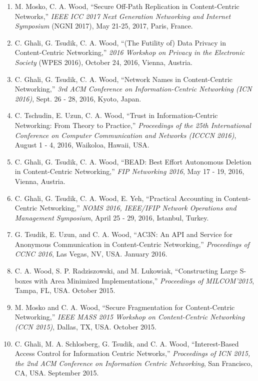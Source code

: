 \documentclass[10pt]{res}
\begin{document}
\begin{resume}
\begin{enumerate}[C-1.]
\item M. Mosko, C. A. Wood, ``Secure Off-Path Replication in Content-Centric Networks,'' \emph{IEEE ICC 2017 Next Generation Networking and Internet Symposium} (NGNI 2017), May 21-25, 2017, Paris, France.

\item C. Ghali, G. Tsudik, C. A. Wood, ``(The Futility of) Data Privacy in Content-Centric Networking,'' \emph{2016 Workshop on Privacy in the Electronic Society} (WPES 2016), October 24, 2016, Vienna, Austria.

\item C. Ghali, G. Tsudik, C. A. Wood, ``Network Names in Content-Centric Networking,'' \emph{3rd ACM Conference on Information-Centric Networking (ICN 2016)}, Sept. 26 - 28, 2016, Kyoto, Japan.

\item C. Tschudin, E. Uzun, C. A. Wood, ``Trust in Information-Centric Networking: From Theory to Practice,'' \emph{Proceedings of the 25th International Conference on Computer Communication and Networks (ICCCN 2016)}, August 1 - 4, 2016, Waikoloa, Hawaii, USA.

\item C. Ghali, G. Tsudik, C. A. Wood, ``BEAD: Best Effort Autonomous Deletion in Content-Centric Networking,'' \emph{FIP Networking 2016}, May 17 - 19, 2016, Vienna, Austria.

\item C. Ghali, G. Tsudik, C. A. Wood, E. Yeh, ``Practical Accounting in Content-Centric Networking,''  \emph{NOMS 2016, IEEE/IFIP Network Operations and Management Symposium}, April 25 - 29, 2016, Istanbul, Turkey.

\item G. Tsudik, E. Uzun, and C. A. Wood, ``AC3N: An API and Service for Anonymous Communication in Content-Centric Networking,'' \emph{Proceedings of CCNC 2016}, Las Vegas, NV, USA. January 2016.

\item C. A. Wood, S. P. Radziszowski, and M. Lukowiak, ``Constructing Large S-boxes with Area Minimized Implementations,'' \emph{Proceedings of MILCOM'2015}, Tampa, FL, USA. October 2015.

\item M. Mosko and C. A. Wood, ``Secure Fragmentation for Content-Centric Networking,'' \emph{IEEE MASS 2015 Workshop on Content-Centric Networking (CCN 2015)}, Dallas, TX, USA. October 2015.

\item C. Ghali, M. A. Schlosberg, G. Tsudik, and C. A. Wood, ``Interest-Based Access Control for Information Centric Networks,'' \emph{Proceedings of ICN 2015, the 2nd ACM Conference on Information Centric Networking}, San Francisco, CA, USA. September 2015.


\end{enumerate}
\end{resume}
\end{document}
